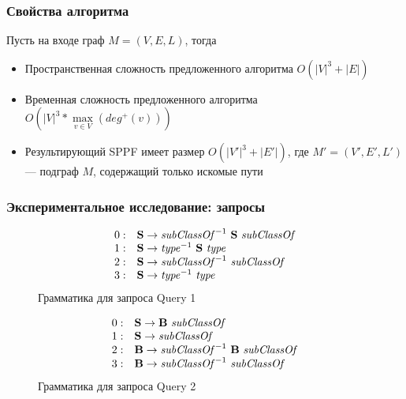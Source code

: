 \documentclass[xcolor=table]{beamer}
\begin{document}
\begin{frame}
  \transwipe[direction=90]
  \frametitle{Свойства алгоритма}

Пусть на входе граф $M=(V,E,L)$, тогда
\begin{itemize} 
\item Пространственная сложность предложенного алгоритма $O(|V|^3 + |E|)$
\item Временная сложность предложенного алгоритма $O\left(|V|^3*\max\limits_{v \in V}\left(deg^+\left(v\right)\right)\right)$
\item Результирующий SPPF имеет размер $O(|V'|^3 + |E'|)$, где $M'=(V',E',L')$ --- подграф $M$, содержащий только искомые пути
\end{itemize}

\end{frame}

\begin{frame}[fragile]
\transwipe[direction=90]
\frametitle{Экспериментальное исследование: запросы}
\begin{figure}[ht]
   \centering

   \[
\begin{array}{rl}
   0: & \textbf{S} \rightarrow \text{\textit{subClassOf}}^{-1} \ \textbf{S} \ \text{\textit{subClassOf}} \\ 
   1: & \textbf{S} \rightarrow \text{\textit{type}}^{-1} \ \textbf{S} \ \text{\textit{type}} \\ 
   2: & \textbf{S} \rightarrow \text{\textit{subClassOf}}^{-1} \ \text{\textit{subClassOf}} \\ 
   3: & \textbf{S} \rightarrow \text{\textit{type}}^{-1} \ \text{\textit{type}} \\ 
\end{array}
\]
   Грамматика для запроса Query 1
   \end{figure}
\begin{figure}[h]%
   \centering

   \[
\begin{array}{rl}
   0: & \textbf{S} \rightarrow \textbf{B} \ \text{\textit{subClassOf}} \\ 
   1: & \textbf{S} \rightarrow \text{\textit{subClassOf}} \\ 
   2: & \textbf{B} \rightarrow \text{\textit{subClassOf}}^{-1} \ \textbf{B} \ \text{\textit{subClassOf}} \\
   3: & \textbf{B} \rightarrow \text{\textit{subClassOf}}^{-1} \ \text{\textit{subClassOf}} \\ 
\end{array}
\]
   Грамматика для запроса Query 2

   \end{figure}

\end{frame}
\end{document}
